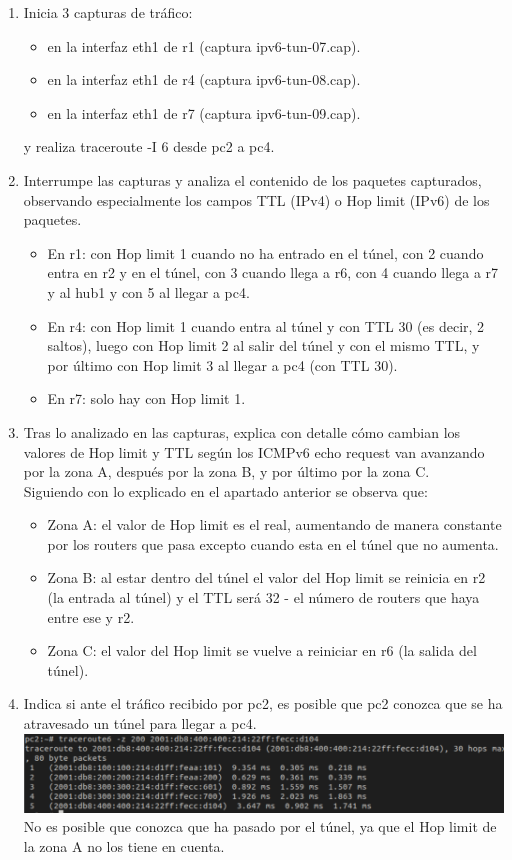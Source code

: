 \documentclass[12pt, a4paper]{report}
\begin{document}
\begin{enumerate}
	
	\item Inicia 3 capturas de tráfico:
	\begin{itemize}
		\item en la interfaz eth1 de r1 (captura ipv6-tun-07.cap).
		\item en la interfaz eth1 de r4 (captura ipv6-tun-08.cap).
		\item en la interfaz eth1 de r7 (captura ipv6-tun-09.cap).
	\end{itemize}
	y realiza traceroute -I 6 desde pc2 a pc4.
	\item Interrumpe las capturas y analiza el contenido de los paquetes capturados, observando especialmente los campos TTL (IPv4) o Hop limit (IPv6) de los paquetes.
	\begin{itemize}
		\item En r1: con Hop limit 1 cuando no ha entrado en el túnel, con 2 cuando entra en r2 y en el túnel, con 3 cuando llega a r6, con 4 cuando llega a r7 y al hub1 y con 5 al llegar a pc4.
		\item En r4: con Hop limit 1 cuando entra al túnel y con TTL 30 (es decir, 2 saltos), luego con Hop limit 2 al salir del túnel y con el mismo TTL, y por último con Hop limit 3 al llegar a pc4 (con TTL 30).
		\item En r7: solo hay con Hop limit 1.
	\end{itemize}
	\item Tras lo analizado en las capturas, explica con detalle cómo cambian los valores de Hop limit
	y TTL según los ICMPv6 echo request van avanzando por la zona A, después por la zona B, y
	por último por la zona C.\\
	
	Siguiendo con lo explicado en el apartado anterior se observa que:
	\begin{itemize}
		\item Zona A: el valor de Hop limit es el real, aumentando de manera constante por los routers que pasa excepto cuando esta en el túnel que no aumenta.
		\item Zona B: al estar dentro del túnel el valor del Hop limit se reinicia en r2 (la entrada al túnel) y el TTL será 32 - el número de routers que haya entre ese y r2.
		\item Zona C: el valor del Hop limit se vuelve a reiniciar en r6 (la salida del túnel).
	\end{itemize}
	\item Indica si ante el tráfico recibido por pc2, es posible que pc2 conozca que se ha atravesado un
	túnel para llegar a pc4.\\
	\includegraphics[width=1\textwidth]{ej10_3}
	No es posible que conozca que ha pasado por el túnel, ya que el Hop limit de la zona A no los tiene en cuenta.
\end{enumerate}
\end{document}
